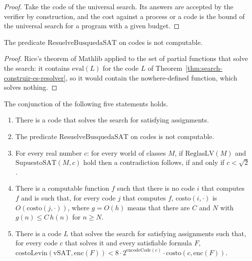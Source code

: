 \begin{proof}
  \leanok
  Take the code of the universal search. Its answers are accepted by the verifier by
  construction, and the cost against a process or a code is the bound of the universal search for a
  program with a given budget.
\end{proof}

\begin{theorem}
  \label{thm:search-no-certificador}
  \leanok
  The predicate $\mathrm{ResuelveBusquedaSAT}$ on codes is not computable.
  \own{}
\end{theorem}

\begin{proof}
  \leanok
  Rice's theorem of Mathlib applied to the set of partial functions that solve the search: it
  contains $\mathrm{eval}(L)$ for the code $L$ of Theorem~\ref{thm:search-construir-es-resolver}, so it
  would contain the nowhere-defined function, which solves nothing.
\end{proof}

\begin{theorem}
  \label{thm:search-cuatro-bootstraps}
  \leanok
  The conjunction of the following five statements holds.
  \begin{enumerate}
    \item There is a code that solves the search for satisfying assignments.
    \item The predicate $\mathrm{ResuelveBusquedaSAT}$ on codes is not computable.
    \item For every real number $c$: for every world of classes $M$, if $\mathrm{ReglasLV}(M)$ and
      $\mathrm{SupuestoSAT}(M, c)$ hold then a contradiction follows, if and only if $c < \sqrt{2}$.
    \item There is a computable function $f$ such that there is no code $i$ that computes $f$ and
      is such that, for every code $j$ that computes $f$, $\mathrm{costo}(i, \cdot)$ is $O(\mathrm{costo}(j, \cdot))$,
      where $g = O(h)$ means that there are $C$ and $N$ with $g(n) \le C\,h(n)$ for $n \ge N$.
    \item There is a code $L$ that solves the search for satisfying assignments such that, for every
      code $c$ that solves it and every satisfiable formula $F$,
      $\mathrm{costoLevin}(\mathrm{vSAT}, \mathrm{enc}(F)) < 8 \cdot 2^{\mathrm{encodeCode}(c)} \cdot \mathrm{costo}(c, \mathrm{enc}(F))$.
  \end{enumerate}
  \own{}
\end{theorem}

